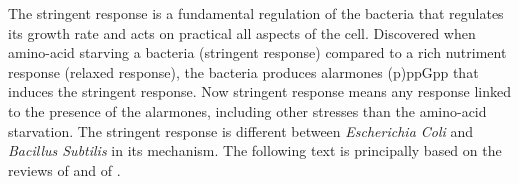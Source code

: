 The stringent response is a fundamental regulation of the bacteria that regulates its growth rate and acts on practical all aspects of the cell. Discovered when amino-acid starving a bacteria (stringent response) compared to a rich nutriment response (relaxed response), the bacteria produces alarmones (p)ppGpp that induces the stringent response. Now stringent response means any response linked to the presence of the alarmones, including other stresses than the amino-acid starvation. The stringent response is different between {\it Escherichia Coli} and {\it Bacillus Subtilis} in its mechanism. The following text is principally based on the reviews of \citet{kriel_direct_2012} and of \citet{wolz_synthesis_2010}.


